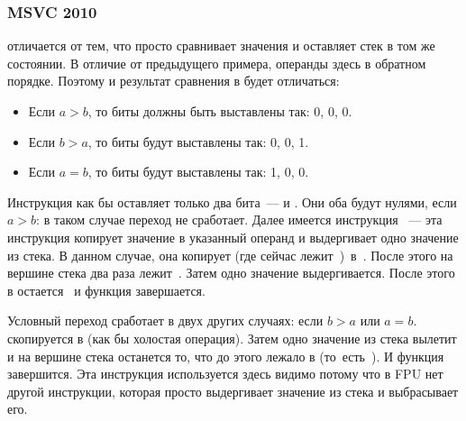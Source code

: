 \subsubsection{\Optimizing MSVC 2010}



\FCOM отличается от \FCOMP тем, что просто сравнивает значения и оставляет стек в том же состоянии. 
В отличие от предыдущего примера, операнды здесь в обратном порядке. 
Поэтому и результат сравнения в \CThreeBits будет отличаться:

\begin{itemize}
\item Если $a>b$, то биты \CThreeBits должны быть выставлены так: 0, 0, 0.
\item Если $b>a$, то биты будут выставлены так: 0, 0, 1.
\item Если $a=b$, то биты будут выставлены так: 1, 0, 0.
\end{itemize}

Инструкция  как бы оставляет только два бита~--- \Cthree и \Czero. 
Они оба будут нулями, если $a>b$: в таком случае переход \JNE не сработает. 
Далее имеется инструкция ~--- эта инструкция копирует 
значение  в указанный операнд и выдергивает одно значение из стека. В данном случае, 
она копирует  
(где сейчас лежит~)~в~. 
После этого на вершине стека два раза лежит~. Затем одно значение выдергивается. 
После этого в  остается~ и функция завершается.

Условный переход \JNE сработает в двух других случаях: если $b>a$ или $a=b$. 
 скопируется в  (как бы холостая операция). 
Затем одно значение из стека вылетит и на вершине стека останется то, что 
до этого лежало в  (то~есть~). И функция завершится. 
Эта инструкция используется здесь видимо потому что в FPU 
нет другой инструкции, которая просто выдергивает 
значение из стека и выбрасывает его.


